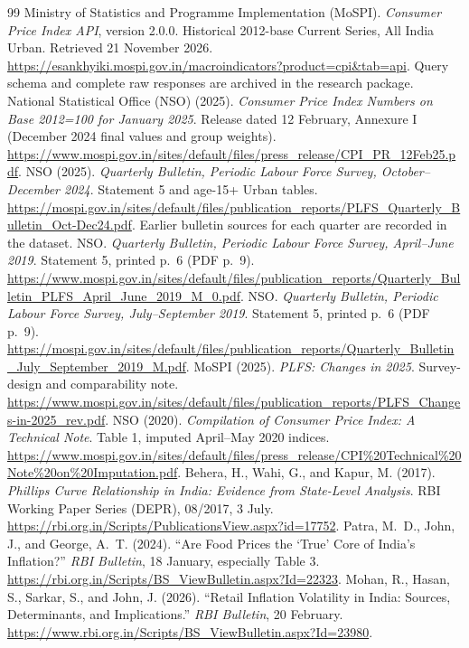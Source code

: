 \documentclass[11pt,a4paper]{article}
\begin{document}
\clearpage
{}
\begin{thebibliography}{99}\small
\setlength{\itemsep}{6pt}
 Ministry of Statistics and Programme Implementation (MoSPI). \emph{Consumer Price Index API}, version 2.0.0. Historical 2012-base Current Series, All India Urban. Retrieved 21 November 2026. \url{https://esankhyiki.mospi.gov.in/macroindicators?product=cpi&tab=api}. Query schema and complete raw responses are archived in the research package.
 National Statistical Office (NSO) (2025). \emph{Consumer Price Index Numbers on Base 2012=100 for January 2025}. Release dated 12 February, Annexure I (December 2024 final values and group weights). \url{https://www.mospi.gov.in/sites/default/files/press_release/CPI_PR_12Feb25.pdf}.
 NSO (2025). \emph{Quarterly Bulletin, Periodic Labour Force Survey, October--December 2024}. Statement 5 and age-15+ Urban tables. \url{https://mospi.gov.in/sites/default/files/publication_reports/PLFS_Quarterly_Bulletin_Oct-Dec24.pdf}. Earlier bulletin sources for each quarter are recorded in the dataset.
 NSO. \emph{Quarterly Bulletin, Periodic Labour Force Survey, April--June 2019}. Statement 5, printed p.~6 (PDF p.~9). \url{https://www.mospi.gov.in/sites/default/files/publication_reports/Quarterly_Bulletin_PLFS_April_June_2019_M_0.pdf}.
 NSO. \emph{Quarterly Bulletin, Periodic Labour Force Survey, July--September 2019}. Statement 5, printed p.~6 (PDF p.~9). \url{https://mospi.gov.in/sites/default/files/publication_reports/Quarterly_Bulletin_July_September_2019_M.pdf}.
 MoSPI (2025). \emph{PLFS: Changes in 2025}. Survey-design and comparability note. \url{https://www.mospi.gov.in/sites/default/files/publication_reports/PLFS_Changes-in-2025_rev.pdf}.
 NSO (2020). \emph{Compilation of Consumer Price Index: A Technical Note}. Table 1, imputed April--May 2020 indices. \url{https://www.mospi.gov.in/sites/default/files/press_release/CPI%20Technical%20Note%20on%20Imputation.pdf}.
 Behera, H., Wahi, G., and Kapur, M. (2017). \emph{Phillips Curve Relationship in India: Evidence from State-Level Analysis}. RBI Working Paper Series (DEPR), 08/2017, 3 July. \url{https://rbi.org.in/Scripts/PublicationsView.aspx?id=17752}.
 Patra, M.~D., John, J., and George, A.~T. (2024). ``Are Food Prices the `True' Core of India's Inflation?'' \emph{RBI Bulletin}, 18 January, especially Table 3. \url{https://rbi.org.in/Scripts/BS_ViewBulletin.aspx?Id=22323}.
 Mohan, R., Hasan, S., Sarkar, S., and John, J. (2026). ``Retail Inflation Volatility in India: Sources, Determinants, and Implications.'' \emph{RBI Bulletin}, 20 February. \url{https://www.rbi.org.in/Scripts/BS_ViewBulletin.aspx?Id=23980}.
\end{thebibliography}
\end{document}
